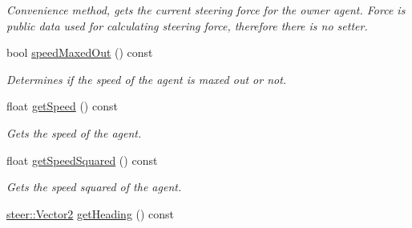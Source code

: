 \begin{DoxyCompactItemize}
\begin{DoxyCompactList}\small\item\em Convenience method, gets the current steering force for the owner agent. Force is public data used for calculating steering force, therefore there is no setter. \end{DoxyCompactList}\item 
\hypertarget{classsteer_1_1_agent_ad78b1ca073d92ed97b035743aa50fe63}{bool \hyperlink{classsteer_1_1_agent_ad78b1ca073d92ed97b035743aa50fe63}{speed\-Maxed\-Out} () const }\label{classsteer_1_1_agent_ad78b1ca073d92ed97b035743aa50fe63}

\begin{DoxyCompactList}\small\item\em Determines if the speed of the agent is maxed out or not. \end{DoxyCompactList}\item 
\hypertarget{classsteer_1_1_agent_a8226ff97ce995f03c7daec808b57edde}{float \hyperlink{classsteer_1_1_agent_a8226ff97ce995f03c7daec808b57edde}{get\-Speed} () const }\label{classsteer_1_1_agent_a8226ff97ce995f03c7daec808b57edde}

\begin{DoxyCompactList}\small\item\em Gets the speed of the agent. \end{DoxyCompactList}\item 
\hypertarget{classsteer_1_1_agent_acf5c7ca1aa5450a3645cbe997d77979f}{float \hyperlink{classsteer_1_1_agent_acf5c7ca1aa5450a3645cbe997d77979f}{get\-Speed\-Squared} () const }\label{classsteer_1_1_agent_acf5c7ca1aa5450a3645cbe997d77979f}

\begin{DoxyCompactList}\small\item\em Gets the speed squared of the agent. \end{DoxyCompactList}\item 
\hypertarget{classsteer_1_1_agent_a3c2fc94062f007f3256b399b7515c67e}{\hyperlink{structsteer_1_1_vector2}{steer\-::\-Vector2} \hyperlink{classsteer_1_1_agent_a3c2fc94062f007f3256b399b7515c67e}{get\-Heading} () const }\label{classsteer_1_1_agent_a3c2fc94062f007f3256b399b7515c67e}


\end{DoxyCompactItemize}
